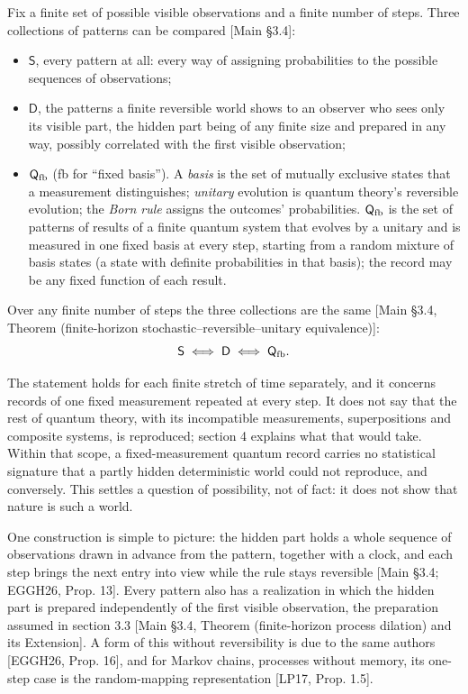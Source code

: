 \documentclass[
]{article}
\providecommand{\tightlist}{%
  \setlength{\itemsep}{0pt}\setlength{\parskip}{0pt}}
\begin{document}
Fix a finite set of possible visible observations and a finite number of
steps. Three collections of patterns can be compared {[}Main §3.4{]}:

\begin{itemize}
\tightlist
\item
  \(\mathsf S\), every pattern at all: every way of assigning
  probabilities to the possible sequences of observations;
\item
  \(\mathsf D\), the patterns a finite reversible world shows to an
  observer who sees only its visible part, the hidden part being of any
  finite size and prepared in any way, possibly correlated with the
  first visible observation;
\item
  \(\mathsf Q_{\rm fb}\) (fb for ``fixed basis''). A \emph{basis} is the
  set of mutually exclusive states that a measurement distinguishes;
  \emph{unitary} evolution is quantum theory's reversible evolution; the
  \emph{Born rule} assigns the outcomes' probabilities.
  \(\mathsf Q_{\rm fb}\) is the set of patterns of results of a finite
  quantum system that evolves by a unitary and is measured in one fixed
  basis at every step, starting from a random mixture of basis states (a
  state with definite probabilities in that basis); the record may be
  any fixed function of each result.
\end{itemize}

Over any finite number of steps the three collections are the same
{[}Main §3.4, Theorem (finite-horizon stochastic--reversible--unitary
equivalence){]}: \[
\mathsf S\;\Longleftrightarrow\;\mathsf D\;\Longleftrightarrow\;\mathsf Q_{\rm fb}.
\]

The statement holds for each finite stretch of time separately, and it
concerns records of one fixed measurement repeated at every step. It
does not say that the rest of quantum theory, with its incompatible
measurements, superpositions and composite systems, is reproduced;
section 4 explains what that would take. Within that scope, a
fixed-measurement quantum record carries no statistical signature that a
partly hidden deterministic world could not reproduce, and conversely.
This settles a question of possibility, not of fact: it does not show
that nature is such a world.

One construction is simple to picture: the hidden part holds a whole
sequence of observations drawn in advance from the pattern, together
with a clock, and each step brings the next entry into view while the
rule stays reversible {[}Main §3.4; EGGH26, Prop. 13{]}. Every pattern
also has a realization in which the hidden part is prepared
independently of the first visible observation, the preparation assumed
in section 3.3 {[}Main §3.4, Theorem (finite-horizon process dilation)
and its Extension{]}. A form of this without reversibility is due to the
same authors {[}EGGH26, Prop. 16{]}, and for Markov chains, processes
without memory, its one-step case is the random-mapping representation
{[}LP17, Prop. 1.5{]}.
\end{document}
